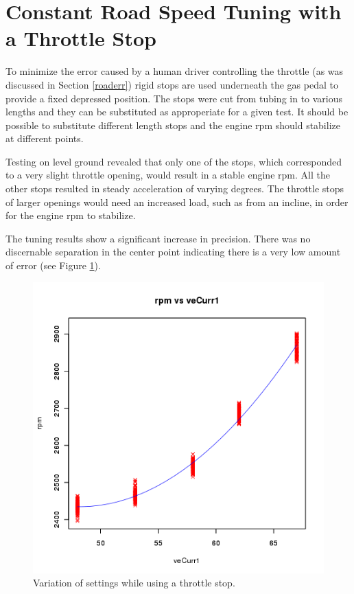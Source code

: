 \documentclass{article}
\begin{document}
\section{Constant Road Speed Tuning with a Throttle Stop}
\label{sec:tstop}

To minimize the error caused by a human driver controlling the throttle
(as was discussed in Section \ref{roaderr})
rigid stops are used underneath the gas pedal to provide a fixed
depressed position.
The stops were cut from tubing in to various lengths and they
can be substituted as approperiate for a given test.
It should be possible to substitute different length stops and
the engine rpm should stabilize at different points.

Testing on level ground revealed that only one of the stops, which
corresponded to a very slight throttle opening, would result in
a stable engine rpm.
All the other stops resulted in steady acceleration of varying degrees.
The throttle stops of larger openings would need an increased load,
such as from an incline, in order for the engine rpm to stabilize.

The tuning results show a significant increase in precision.
There was no discernable separation in the center point
indicating there is a very low amount of error (see Figure \ref{fig:tstop}).

\begin{figure}[!htb]
\center
\includegraphics[scale=0.5]{20110615-throttle_stop.png}
\caption{Variation of settings while using a throttle stop.}
\label{fig:tstop}
\end{figure}
\end{document}
